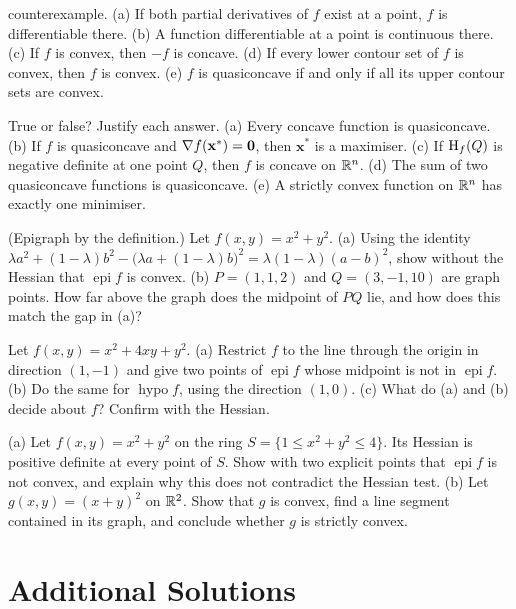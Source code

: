\begin{problems}
        counterexample.
        (a) If both partial derivatives of $f$ exist at a point, $f$ is
        differentiable there.
        (b) A function differentiable at a point is continuous there.
        (c) If $f$ is convex, then $-f$ is concave.
        (d) If every lower contour set of $f$ is convex, then $f$ is
        convex.
        (e) $f$ is quasiconcave if and only if all its upper contour sets
        are convex.
  \item True or false? Justify each answer.
        (a) Every concave function is quasiconcave.
        (b) If $f$ is quasiconcave and $\nabla f(\mathbf{x}^{*})=\mathbf{0}$,
        then $\mathbf{x}^{*}$ is a maximiser.
        (c) If $\operatorname{H}_f(Q)$ is negative definite at one point $Q$, then $f$
        is concave on $\mathbb{R}^{n}$.
        (d) The sum of two quasiconcave functions is quasiconcave.
        (e) A strictly convex function on $\mathbb{R}^{n}$ has exactly one
        minimiser.
  \item (Epigraph by the definition.) Let $f(x,y)=x^{2}+y^{2}$.
        (a) Using the identity
        $\lambda a^{2}+(1-\lambda)b^{2}-\bigl(\lambda a+(1-\lambda)b\bigr)^{2}
        =\lambda(1-\lambda)(a-b)^{2}$, show without the Hessian that
        $\operatorname{epi}f$ is convex.
        (b) $P=(1,1,2)$ and $Q=(3,-1,10)$ are graph points. How far above
        the graph does the midpoint of $PQ$ lie, and how does this match
        the gap in (a)?
  \item Let $f(x,y)=x^{2}+4xy+y^{2}$.
        (a) Restrict $f$ to the line through the origin in direction
        $(1,-1)$ and give two points of $\operatorname{epi}f$ whose midpoint
        is not in $\operatorname{epi}f$.
        (b) Do the same for $\operatorname{hypo}f$, using the direction
        $(1,0)$.
        (c) What do (a) and (b) decide about $f$? Confirm with the Hessian.
  \item (a) Let $f(x,y)=x^{2}+y^{2}$ on the ring
        $S=\{1\le x^{2}+y^{2}\le4\}$. Its Hessian is positive definite at
        every point of $S$. Show with two explicit points that
        $\operatorname{epi}f$ is not convex, and explain why this does not
        contradict the Hessian test.
        (b) Let $g(x,y)=(x+y)^{2}$ on $\mathbb{R}^{2}$. Show that $g$ is convex,
        find a line segment contained in its graph, and conclude whether
        $g$ is strictly convex.
\end{problems}

\section{Additional Solutions}

